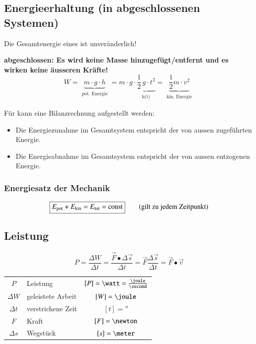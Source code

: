 \subsection{Energieerhaltung (in abgeschlossenen Systemen)}

Die Gesamtenergie eines  ist unveränderlich! 

\textbf{abgeschlossen: Es wird keine Masse hinzugefügt/entfernt und es wirken keine äusseren Kräfte!} 
$$ \boxed{ W = \underbrace{m \cdot g \cdot h}_{\substack{\text{pot. Energie}}} 
	=  m \cdot g \cdot \underbrace{ \frac{1}{2} \, g \cdot t^2}_{\substack{\text{h(t)}}} 
	= \underbrace{ \frac{1}{2} m \cdot v^2 }_{\substack{\text{kin. Energie}}} } $$

Für  kann eine Bilanzrechnung aufgestellt werden:
\vspace{0.1cm}
\begin{itemize}
	\item Die Energiezunahme im Gesamtsystem entspricht der von aussen zugeführten Energie.
	\item Die Energieabnahme im Gesamtsystem entspricht der von aussen entzogenen Energie.
\end{itemize}


\subsubsection{Energiesatz der Mechanik} 

\vspace{-0.2cm}
$$ \boxed{ E_{\rm pot} + E_{\rm kin} = E_{\rm tot} = \text{const} } \qquad \text{(gilt zu jedem Zeitpunkt)} $$


\subsection{Leistung}

\vspace{-0.2cm}
$$ \boxed{ P = \frac{\Delta W}{\Delta t} = \frac{\vec{F} \bullet \Delta \vec{s}}{\Delta t} 
	= \vec{F} \frac{\Delta \vec{s}}{\Delta t} = \vec{F} \bullet \vec{v} } $$ 

\begin{tabular}{c l c}
	$P$ 		& Leistung 			& $[P] = \watt = \frac{\joule}{\second}$	\\
	$\Delta W$ 	& geleistete Arbeit & $[W] = \joule$							\\
	$\Delta t$ 	& verstrichene Zeit & $[t] = \second$ 							\\
	$F$ 		& Kraft 			& $[F] = \newton$ 							\\
	$\Delta s$ 	& Wegstück 			& $[s] = \meter$ 
\end{tabular}


